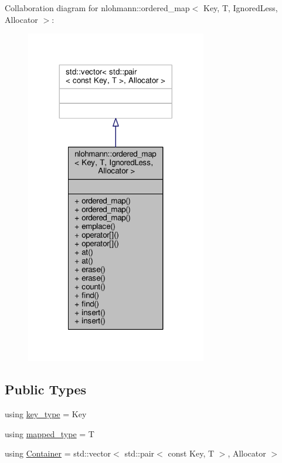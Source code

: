 Collaboration diagram for nlohmann\+:\+:ordered\+\_\+map$<$ Key, T, Ignored\+Less, Allocator $>$\+:
\nopagebreak
\begin{figure}[H]
\begin{center}
\leavevmode
\includegraphics[width=224pt]{structnlohmann_1_1ordered__map__coll__graph}
\end{center}
\end{figure}
\subsection*{Public Types}
\begin{DoxyCompactItemize}
\item 
using \hyperlink{structnlohmann_1_1ordered__map_a57095c6ed403f02e1bc2c240a13c9ed8}{key\+\_\+type} = Key
\item 
using \hyperlink{structnlohmann_1_1ordered__map_a1c9c1509ee714a9814b45a8030c84ec7}{mapped\+\_\+type} = T
\item 
using \hyperlink{structnlohmann_1_1ordered__map_a0cabe346c38a4f1ab1b8a396fbd2bbe2}{Container} = std\+::vector$<$ std\+::pair$<$ const Key, T $>$, Allocator $>$
\end{DoxyCompactItemize}
